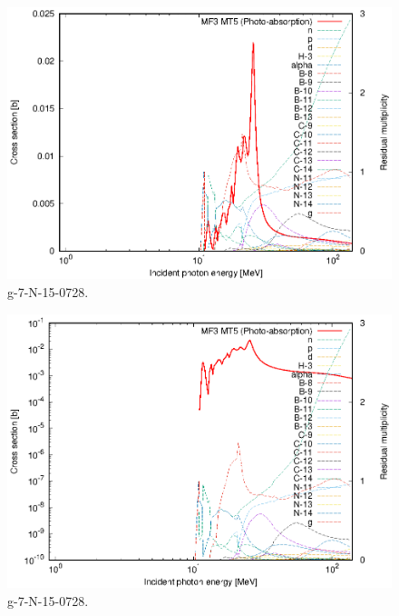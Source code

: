 \begin{figure}
 \includegraphics[width=\linewidth]{eps/g_7-N-15_0728.eps}
  \caption{g-7-N-15-0728.}
\end{figure}
\begin{figure}
 \includegraphics[width=\linewidth]{eps-log/g_7-N-15_0728.eps}
 \caption{g-7-N-15-0728.}
\end{figure}
\newpage \clearpage

